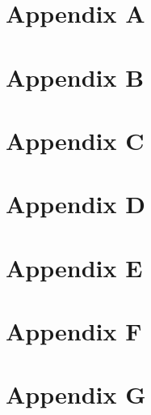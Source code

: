 \documentclass[%
	paper=A4,					%
	twoside=true,				%
	openright,					%
	chapterprefix=true,			%
	11pt,						%
	headings=normal,			%
	bibliography=totoc,			%
	listof=totoc,				%
	titlepage=on,				%
	captions=tableabove,		%
	draft=false,				%
]{scrreprt}
\begin{document}
\begin{appendices}
\chapter{Appendix A}

\chapter{Appendix B}

\chapter{Appendix C}
	
\chapter{Appendix D}

\chapter{Appendix E}

\chapter{Appendix F}

\chapter{Appendix G}

\end{appendices} 

\cleardoublepage
{%
\renewcommand{\bibfont}{\normalfont\small}
\setlength{\biblabelsep}{0pt}
\setlength{\bibitemsep}{0.5\baselineskip plus 0.5\baselineskip}
\printbibliography} 
\end{document}
